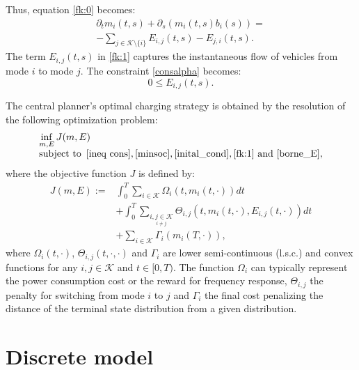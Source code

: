 \documentclass[conference]{IEEEtran}
\def\K{\mathcal{K}}
\begin{document}
Thus, equation \eqref{fk:0} becomes:
\begin{equation}
\label{fk:1}
\begin{array}{l}
\partial_t m_i(t,s)+\partial_s(m_i(t,s)b_i(s))= \\
-\sum_{j\in\K\setminus\{i\}}E_{i,j}(t,s)-E_{j,i}(t,s).
\end{array}
\end{equation}
The term $E_{i,j}(t,s)$ in \eqref{fk:1} captures the instantaneous flow of vehicles from mode $i$ to mode $j$. The constraint \eqref{consalpha} becomes:
\begin{equation}
\label{borne_E}
0\leq E_{i,j}(t,s).
\end{equation}

The central planner's optimal charging strategy is obtained by the resolution of the following optimization problem:
\begin{equation}
\label{prob:primdual}
\begin{array}{l}
 \underset{m,E}{\inf}\,J(m,E)  \\
 \mbox{subject to }\,\eqref{ineq cons}, \eqref{minsoc}, \eqref{inital_cond},\eqref{fk:1} \mbox{ and }\eqref{borne_E},
\end{array}
 \end{equation}
where the objective function $J$ is defined by:
 \begin{equation}
 \label{defJ}
 \begin{array}{ll}
  J(m,E):= &  \int_0^T\sum_{i\in\K } \Omega_i(t,m_i(t,\cdot))dt\\
 & +\int_0^T\sum_{\underset{i\neq j}{i,j\in\K }}
\Theta_{i,j}(t,m_i(t,\cdot),E_{i,j}(t,\cdot))dt\\
  & +\sum_{i\in\K}\Gamma_i(m_i(T,\cdot)),
 \end{array}
\end{equation}
where $\Omega_i(t,\cdot)$, $\Theta_{i,j}(t,\cdot,\cdot)$ and $\Gamma_i$ are lower semi-continuous (l.s.c.) and convex functions for any $i,j\in\K$ and $t\in[0,T)$. The function $\Omega_i$ can typically represent the power consumption cost or the reward for frequency response, $\Theta_{i,j}$ the penalty for switching from mode $i$ to $j$ and $\Gamma_i$ the final cost penalizing the distance of the terminal state distribution from a given distribution. 
\section{Discrete model}\label{discrete_section}
\end{document}
